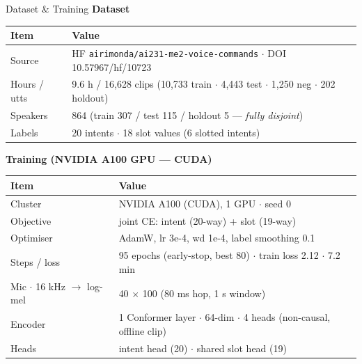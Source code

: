 \documentclass[aspectratio=169,10pt]{beamer}
\begin{document}
\begin{frame}{Dataset \& Training}
\small
\textbf{Dataset}
\begin{table}
\centering
\begin{tabular}{@{}ll@{}}
\toprule
\textbf{Item} & \textbf{Value} \\
\midrule
Source & HF \texttt{airimonda/ai231-me2-voice-commands} $\cdot$ DOI 10.57967/hf/10723 \\
Hours / utts & 9.6 h / 16,628 clips (10,733 train $\cdot$ 4,443 test $\cdot$ 1,250 neg $\cdot$ 202 holdout) \\
Speakers & 864 (train 307 / test 115 / holdout 5 --- \emph{fully disjoint}) \\
Labels & 20 intents $\cdot$ 18 slot values (6 slotted intents) \\
\bottomrule
\end{tabular}
\end{table}

\vspace{0.4em}
\textbf{Training (NVIDIA A100 GPU --- CUDA)}
\begin{table}
\centering
\begin{tabular}{@{}ll@{}}
\toprule
\textbf{Item} & \textbf{Value} \\
\midrule
Cluster & NVIDIA A100 (CUDA), 1 GPU $\cdot$ seed 0 \\
Objective & joint CE: intent (20-way) + slot (19-way) \\
Optimiser & AdamW, lr 3e-4, wd 1e-4, label smoothing 0.1 \\
Steps / loss & 95 epochs (early-stop, best 80) $\cdot$ train loss 2.12 $\cdot$ 7.2 min \\
Mic $\cdot$ 16 kHz $\rightarrow$ log-mel & 40 $\times$ 100 (80 ms hop, 1 s window) \\
Encoder & 1 Conformer layer $\cdot$ 64-dim $\cdot$ 4 heads (non-causal, offline clip) \\
Heads & intent head (20) $\cdot$ shared slot head (19) \\
\bottomrule
\end{tabular}
\end{table}
\end{frame}
\end{document}
